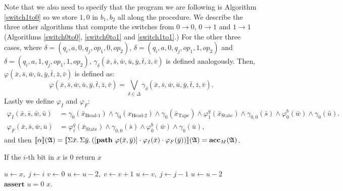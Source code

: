 Note that we also need to specify that the program we are following is Algorithm \ref{switch1to0} so we store $1,0$ in $b_1,b_2$ all along the procedure. We describe the three other algorithms that compute the switches from $0\to 0$, $0\to 1$ and $1\to 1$ (Algorithms \ref{switch0to0}, \ref{switch0to1} and \ref{switch1to1}.)
For the other three cases, where $\delta = (q_i,a,0,q_j,op_1,0,op_2)$, $\delta = (q_i,a,0,q_j,op_1,1,op_2)$ and $\delta = (q_i,a,1,q_j,op_1,1,op_2)$, $\gamma_{\delta}(\bar{x},\bar{s},\bar{w},\bar{u},\bar{y},\bar{t},\bar{z},\bar{v})$ is defined analogously. Then, $\varphi(\bar{x},\bar{s},\bar{w},\bar{u},\bar{y},\bar{t},\bar{z},\bar{v})$ is defined as:
$$
\varphi(\bar{x},\bar{s},\bar{w},\bar{u},\bar{y},\bar{t},\bar{z},\bar{v}) = \bigvee_{\delta \in \Delta} \gamma_{\delta}(\bar{x},\bar{s},\bar{w},\bar{u},\bar{y},\bar{t},\bar{z},\bar{v}).
$$
Lastly we define $\varphi_I$ and $\varphi_F$:
\begin{align*}
\varphi_I(\bar{x},\bar{s},\bar{w},\bar{u}) &= \gamma_0(\bar{x}_{\text{Head-1}}) \wedge \gamma_0(x_{\text{Head-2}}) \wedge \gamma_0(\bar{x}_{\text{Tape}}) \wedge \varphi^{q}_1(\bar{x}_{\text{State}})\wedge \gamma_{0,0}(\bar{s})\wedge \varphi^b_0(\bar{w}) \wedge\gamma_0(\bar{u}). \\
\varphi_F(\bar{x},\bar{s},\bar{w},\bar{u}) &= \varphi^q_{\ell}(\bar{x}_{\text{State}}) \wedge \gamma_{0,0}(\bar{s}) \wedge \varphi^b_0(\bar{w}) \wedge\gamma_0(\bar{u}),
\end{align*}
and then ${\llbracket{}{\alpha}\rrbracket}(\mathfrak{A}) = {\llbracket{}{\Sigma{\bar{x}}.\,\Sigma{\bar{y}}.\,([{\bf path} \,\, \varphi(\bar{x},\bar{y})]\cdot \varphi_I(\bar{x})\cdot\varphi_F(\bar{y}))}\rrbracket}(\mathfrak{A}) = \textbf{acc}_M(\mathfrak{A})$.

\begin{algorithm}
	\caption{If the $i$-th bit in $x$ is 0 return $x$} \label{switch0to0}
	\begin{algorithmic}
		\State $u \gets x,\; j \gets i$ 
		\State $v \gets 0$
		\State $u \gets u-2,\; v \gets v+1$
		\EndWhile
		\State $u\gets v,\; j \gets j-1$
		\EndWhile
		\State $u \gets u-2$
		\EndWhile
		\State $\textbf{assert } u = 0$ 	
		\State \Return $x$.
	\end{algorithmic}
\end{algorithm}


